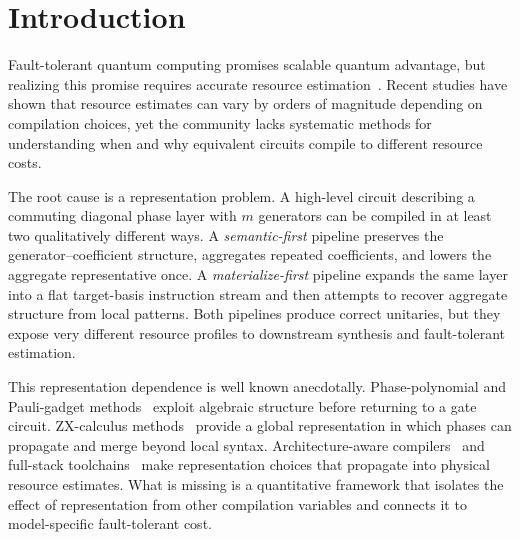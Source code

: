 \documentclass[aps,prx,reprint,floatfix,superscriptaddress]{revtex4-2}
\begin{document}
\section{Introduction}
\label{sec:introduction}

Fault-tolerant quantum computing promises scalable quantum advantage, but
realizing this promise requires accurate resource
estimation~\cite{fellous2023optimizing,watkins2024surfacecode}. Recent
studies have shown that resource estimates can vary by orders of magnitude
depending on compilation choices, yet the community lacks systematic
methods for understanding when and why equivalent circuits compile to
different resource costs.

The root cause is a representation problem. A high-level circuit describing
a commuting diagonal phase layer with $m$ generators can be compiled in at
least two qualitatively different ways. A \emph{semantic-first} pipeline
preserves the generator--coefficient structure, aggregates repeated
coefficients, and lowers the aggregate representative once. A
\emph{materialize-first} pipeline expands the same layer into a flat
target-basis instruction stream and then attempts to recover aggregate
structure from local patterns. Both pipelines produce correct unitaries,
but they expose very different resource profiles to downstream synthesis
and fault-tolerant estimation.

This representation dependence is well known anecdotally. Phase-polynomial
and Pauli-gadget methods~\cite{amy2014tdepth,nam2018automated,cowtan2020phase}
exploit algebraic structure before returning to a gate circuit.
ZX-calculus methods~\cite{duncan2020graph,kissinger2020reducing,kissinger2020pyzx}
provide a global representation in which phases can propagate and merge
beyond local syntax. Architecture-aware
compilers~\cite{martiel2022architecture} and full-stack
toolchains~\cite{watkins2024surfacecode} make representation choices that
propagate into physical resource estimates. What is missing is a
quantitative framework that isolates the effect of representation from
other compilation variables and connects it to model-specific
fault-tolerant cost.
\end{document}
